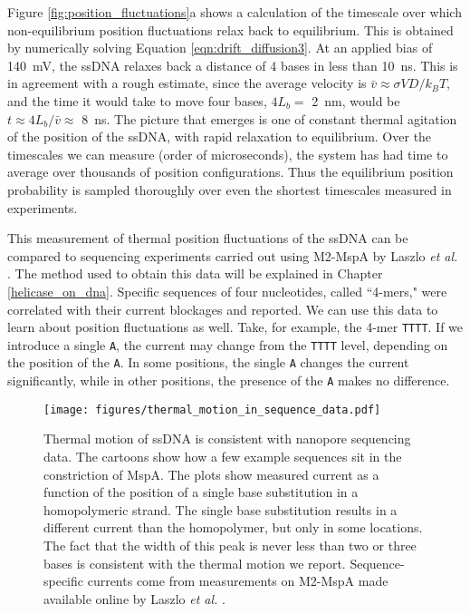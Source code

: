 Figure \ref{fig:position_fluctuations}a shows a calculation of the timescale over which non-equilibrium position fluctuations relax back to equilibrium.  This is obtained by numerically solving Equation \ref{eqn:drift_diffusion3}.  At an applied bias of \SI{140}{\mV}, the ssDNA relaxes back a distance of 4 bases in less than \SI{10}{\ns}.  This is in agreement with a rough estimate, since the average velocity is $\bar{v} \approx \sigma V D / k_B T$, and the time it would take to move four bases, $4 L_b = $ \SI{2}{\nm}, would be $t \approx 4 L_b / \bar{v} \approx $ \SI{8}{\ns}.  The picture that emerges is one of constant thermal agitation of the position of the ssDNA, with rapid relaxation to equilibrium.  Over the timescales we can measure (order of microseconds), the system has had time to average over thousands of position configurations.  Thus the equilibrium position probability is sampled thoroughly over even the shortest timescales measured in experiments.

This measurement of thermal position fluctuations of the ssDNA can be compared to sequencing experiments carried out using M2-MspA by Laszlo \textit{et al.} \citep{Laszlo2014}.  The method used to obtain this data will be explained in Chapter \ref{helicase_on_dna}.  Specific sequences of four nucleotides, called ``4-mers," were correlated with their current blockages and reported.  We can use this data to learn about position fluctuations as well.  Take, for example, the 4-mer \texttt{TTTT}.  If we introduce a single \texttt{A}, the current may change from the \texttt{TTTT} level, depending on the position of the \texttt{A}.  In some positions, the single \texttt{A} changes the current significantly, while in other positions, the presence of the \texttt{A} makes no difference.

\begin{figure}[H] %
\begin{centering}
\texttt{[image: figures/thermal\_motion\_in\_sequence\_data.pdf]}
\caption[Thermal motion averaging in sequencing data]{Thermal motion of ssDNA is consistent with nanopore sequencing data.  The cartoons show how a few example sequences sit in the constriction of MspA.  The plots show measured current as a function of the position of a single base substitution in a homopolymeric strand.  The single base substitution results in a different current than the homopolymer, but only in some locations.  The fact that the width of this peak is never less than two or three bases is consistent with the thermal motion we report.  Sequence-specific currents come from measurements on M2-MspA made available online by Laszlo \textit{et al.} \citep{Laszlo2014}.}
\label{fig:thermal_motion_sequencing}
\end{centering}
\end{figure}

